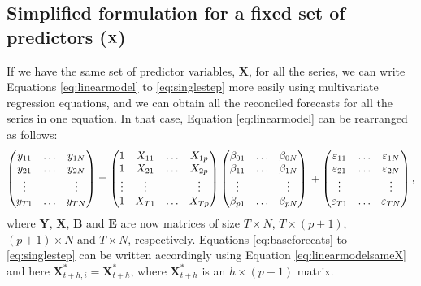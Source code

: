 \documentclass[11pt,a4paper,]{article}
\begin{document}
\hypertarget{simplified-formulation-for-a-fixed-set-of-predictors-bf-x}{%
\subsection{\texorpdfstring{Simplified formulation for a fixed set of
predictors (\(\bf {X}\))
\label{sec:proposedapproach2}}{Simplified formulation for a fixed set of predictors (\textbackslash{}bf \{X\}) }}\label{simplified-formulation-for-a-fixed-set-of-predictors-bf-x}}

If we have the same set of predictor variables, \(\bm{X}\), for all the
series, we can write Equations \eqref{eq:linearmodel} to
\eqref{eq:singlestep} more easily using multivariate regression equations,
and we can obtain all the reconciled forecasts for all the series in one
equation. In that case, Equation \eqref{eq:linearmodel} can be rearranged
as follows: \begin{equation}\label{eq:linearmodelsameX}
  \begin{pmatrix}
  y_{11} & \dots & y_{1N}\\
  y_{21} & \dots & y_{2N}\\
  \vdots &       & \vdots\\
  y_{T1} & \dots & y_{TN}
  \end{pmatrix} =
  \begin{pmatrix}
  1      & X_{11} & \dots & X_{1p}\\
  1      & X_{21} & \dots & X_{2p}\\
  \vdots & \vdots &       & \vdots\\
  1      & X_{T1} & \dots & X_{Tp}
  \end{pmatrix}
  \begin{pmatrix}
  \beta_{01} & \dots & \beta_{0N}\\
  \beta_{11} & \dots & \beta_{1N}\\
  \vdots     &       & \vdots\\
  \beta_{p1} & \dots & \beta_{pN}
  \end{pmatrix} \\
  +
  \begin{pmatrix}
  \varepsilon_{11} & \dots & \varepsilon_{1N}\\
  \varepsilon_{21} & \dots & \varepsilon_{2N}\\
  \vdots           &       & \vdots\\
  \varepsilon_{T1} & \dots & \varepsilon_{TN}
  \end{pmatrix},
\end{equation} where \(\bm{Y}\), \(\bm{X}\), \(\bm{B}\) and \(\bm{E}\)
are now matrices of size \(T\times N\), \(T\times (p+1)\),
\((p+1)\times N\) and \(T \times N\), respectively. Equations
\eqref{eq:baseforecats} to \eqref{eq:singlestep} can be written accordingly
using Equation \eqref{eq:linearmodelsameX} and here
\(\bm{X}^*_{t+h,i} = \bm{X}^*_{t+h}\), where \(\bm{X}^*_{t+h}\) is an
\(h\times (p+1)\) matrix.
\end{document}
